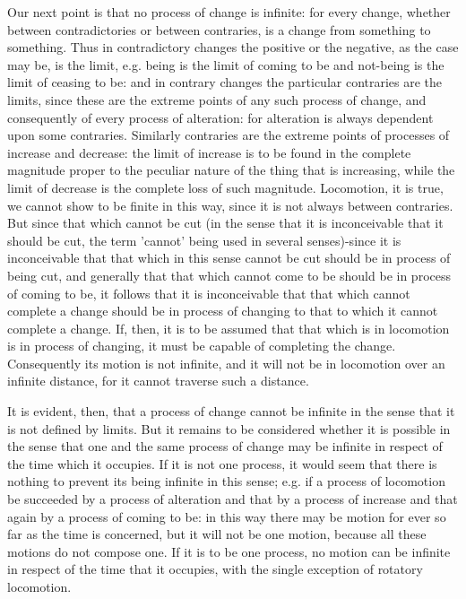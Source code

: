 Our next point is that no process of change is infinite: for every
change, whether between contradictories or between contraries, is
a change from something to something. Thus in contradictory changes
the positive or the negative, as the case may be, is the limit, e.g.
being is the limit of coming to be and not-being is the limit of ceasing
to be: and in contrary changes the particular contraries are the limits,
since these are the extreme points of any such process of change,
and consequently of every process of alteration: for alteration is
always dependent upon some contraries. Similarly contraries are the
extreme points of processes of increase and decrease: the limit of
increase is to be found in the complete magnitude proper to the peculiar
nature of the thing that is increasing, while the limit of decrease
is the complete loss of such magnitude. Locomotion, it is true, we
cannot show to be finite in this way, since it is not always between
contraries. But since that which cannot be cut (in the sense that
it is inconceivable that it should be cut, the term 'cannot' being
used in several senses)-since it is inconceivable that that which
in this sense cannot be cut should be in process of being cut, and
generally that that which cannot come to be should be in process of
coming to be, it follows that it is inconceivable that that which
cannot complete a change should be in process of changing to that
to which it cannot complete a change. If, then, it is to be assumed
that that which is in locomotion is in process of changing, it must
be capable of completing the change. Consequently its motion is not
infinite, and it will not be in locomotion over an infinite distance,
for it cannot traverse such a distance. 

It is evident, then, that a process of change cannot be infinite in
the sense that it is not defined by limits. But it remains to be considered
whether it is possible in the sense that one and the same process
of change may be infinite in respect of the time which it occupies.
If it is not one process, it would seem that there is nothing to prevent
its being infinite in this sense; e.g. if a process of locomotion
be succeeded by a process of alteration and that by a process of increase
and that again by a process of coming to be: in this way there may
be motion for ever so far as the time is concerned, but it will not
be one motion, because all these motions do not compose one. If it
is to be one process, no motion can be infinite in respect of the
time that it occupies, with the single exception of rotatory locomotion.

